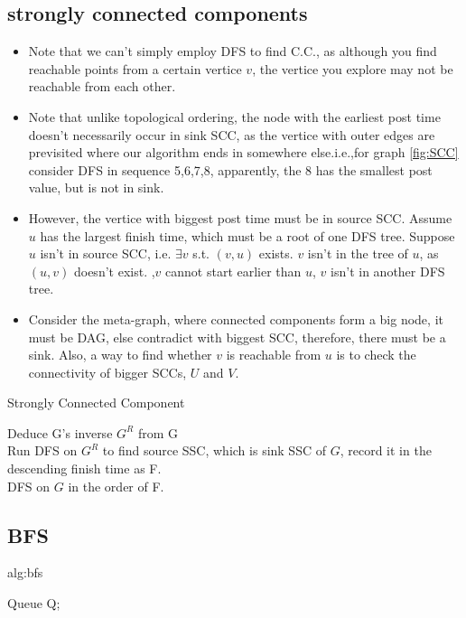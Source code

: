 \documentclass{article}
\begin{document}
\subsection{strongly connected components}  
\begin{itemize}
    \item Note that we can't simply employ DFS to find C.C., as although you find reachable points from a certain vertice $v$, the vertice you explore may not be reachable from each other.
    \item Note that unlike topological ordering, the node with the earliest post time doesn't necessarily occur in sink SCC,
    as the vertice with outer edges are previsited where our algorithm ends in somewhere else.i.e.,for graph \ref{fig:SCC} consider DFS in sequence {5,6,7,8}, apparently, the 8 has the smallest post value, but is not in sink.
    \item However, the vertice with biggest post time must be in source SCC. 
    Assume $u$ has the largest finish time, which must be a root of one DFS tree. Suppose $u$ isn't in source SCC, i.e. $\exists v$ s.t. $(v,u)$ exists. 
    $v$ isn't in the tree of $u$, as $(u,v)$ doesn't exist.
    ,$v$ cannot start earlier than $u$, $v$ isn't in another DFS tree. 
    \item Consider the meta-graph, where connected components form a big node, it must be DAG, else contradict with biggest SCC, therefore, there must be a sink. Also, a way to find whether $v$ is reachable from $u$ is to check the connectivity of bigger SCCs, $U$ and $V$. 
    
\end{itemize}

\begin{algorithm}
    \caption{Strongly Connected Component}
    \label{alg:SCC}
    Deduce G's inverse $G^R$ from G\\
    Run DFS on $G^R$ to find source SSC, which is sink SSC of $G$, record it in the descending finish time as F.\\
    DFS on $G$ in the order of F.
\end{algorithm}
\subsection{BFS}
\begin{algorithm}
    \caption{alg:bfs}
    \label{Naive BFS}
    Queue Q;\\
\end{algorithm}
\end{document}
